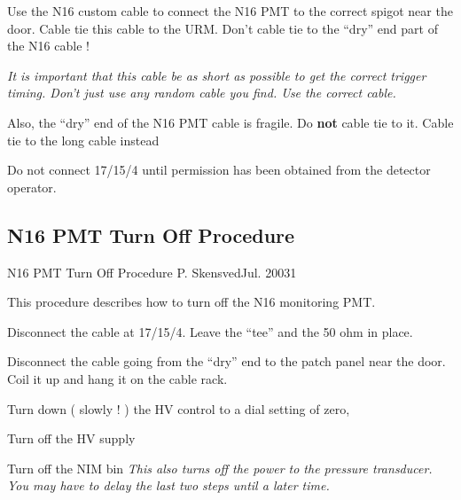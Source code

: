 \begin{enumerate}
\checkitem Use the N16 custom cable to connect the N16 PMT to the correct spigot near the door.
Cable tie this cable  to the URM. Don't cable tie to the ``dry'' end part of the N16 cable !


\small
{\em It is important that this cable be as short as possible to get the correct trigger timing. Don't
just use any random cable you find. Use the correct cable.

  Also, the ``dry'' end of the N16 PMT cable is fragile. Do {\bf not} cable tie to it. Cable tie to the 
long cable instead}

\normalsize


\checkitem Do not connect 17/15/4 until permission has been obtained from the detector operator.


\end{enumerate}


\newpage

\subsection{N16 PMT Turn Off Procedure}

             {N16 PMT Turn Off Procedure}
        {P. Skensved}{Jul. 2003}{1}


 This procedure describes how to turn off the N16 monitoring PMT.

\begin{enumerate}

\checkitem Disconnect the cable at 17/15/4. Leave the ``tee'' and the 50 ohm in place.


\checkitem Disconnect the cable going from the ``dry'' end to the patch  panel near the door.
Coil it up and hang it on the cable rack.

\checkitem Turn down ( slowly ! ) the HV control to a dial setting of zero,

\checkitem Turn off the HV supply

\checkitem Turn off the NIM bin
\small
{\em This also turns off the power to the pressure transducer. You may have to delay the last
two steps until  a later time.}

\normalsize

\end{enumerate}

